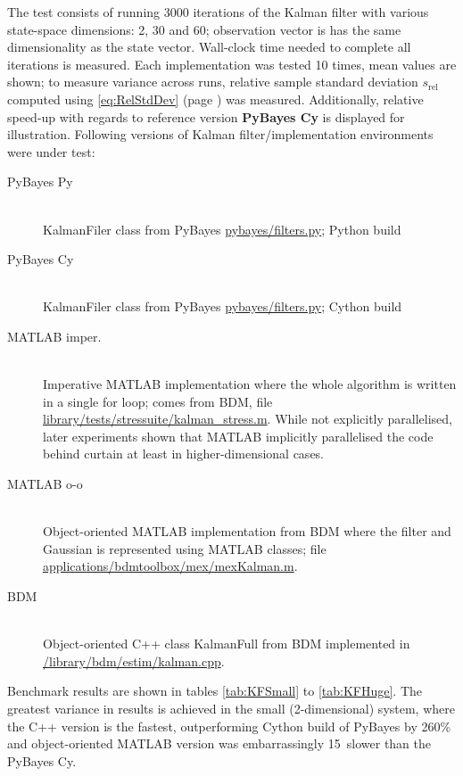 The test consists of running 3000 iterations of the Kalman filter with various state-space dimensions:
2, 30 and 60; observation vector is has the same dimensionality as the state vector. Wall-clock time
needed to complete all iterations is measured. Each implementation was tested 10 times, mean values
are shown; to measure variance across runs, relative sample standard deviation \(s_{\text{rel}}\)
computed using \eqref{eq:RelStdDev} (page \pageref{eq:RelStdDev}) was measured. Additionally,
relative speed-up with regards to reference version \textbf{PyBayes Cy} is displayed for
illustration. Following versions of Kalman filter/implementation environments were under test:
\begin{description}
	\item[PyBayes Py] \hfill \\
		KalmanFiler class from PyBayes \url{pybayes/filters.py}; Python build
	\item[PyBayes Cy] \hfill \\
		KalmanFiler class from PyBayes \url{pybayes/filters.py}; Cython build
	\item[MATLAB imper.] \hfill \\
		Imperative MATLAB implementation where the whole algorithm is written
		in a single for loop; comes from BDM, file \url{library/tests/stressuite/kalman_stress.m}.
		While not explicitly parallelised, later experiments shown that MATLAB implicitly
		parallelised the code behind curtain at least in higher-dimensional cases.
	\item[MATLAB o-o] \hfill \\
		Object-oriented MATLAB implementation from BDM where the filter and Gaussian {\pdf} is
		represented using MATLAB classes; file \url{applications/bdmtoolbox/mex/mexKalman.m}.
	\item[BDM] \hfill \\
		 Object-oriented C++ class KalmanFull from BDM implemented in
		 \url{/library/bdm/estim/kalman.cpp}.
\end{description}
Benchmark results are shown in tables \ref{tab:KFSmall} to \ref{tab:KFHuge}. The greatest variance
in results is achieved in the small (2-dimensional) system, where the C++ version is the fastest,
outperforming Cython build of PyBayes by 260\% and object-oriented MATLAB version was embarrassingly
15\x\ slower than the PyBayes Cy.

